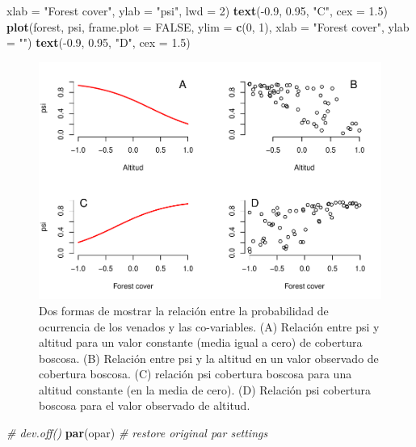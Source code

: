 \documentclass[]{book}
\newenvironment{Shaded}{\begin{snugshade}}{\end{snugshade}}
\newcommand{\KeywordTok}[1]{\textcolor[rgb]{0.13,0.29,0.53}{\textbf{{#1}}}}
\newcommand{\DataTypeTok}[1]{\textcolor[rgb]{0.13,0.29,0.53}{{#1}}}
\newcommand{\DecValTok}[1]{\textcolor[rgb]{0.00,0.00,0.81}{{#1}}}
\newcommand{\FloatTok}[1]{\textcolor[rgb]{0.00,0.00,0.81}{{#1}}}
\newcommand{\StringTok}[1]{\textcolor[rgb]{0.31,0.60,0.02}{{#1}}}
\newcommand{\CommentTok}[1]{\textcolor[rgb]{0.56,0.35,0.01}{\textit{{#1}}}}
\newcommand{\OtherTok}[1]{\textcolor[rgb]{0.56,0.35,0.01}{{#1}}}
\newcommand{\NormalTok}[1]{{#1}}
\begin{document}
\begin{Shaded}
\begin{Highlighting}[]
      \DataTypeTok{xlab =} \StringTok{"Forest cover"}\NormalTok{, }\DataTypeTok{ylab =} \StringTok{"psi"}\NormalTok{, }\DataTypeTok{lwd =} \DecValTok{2}\NormalTok{)}
\KeywordTok{text}\NormalTok{(-}\FloatTok{0.9}\NormalTok{, }\FloatTok{0.95}\NormalTok{, }\StringTok{"C"}\NormalTok{, }\DataTypeTok{cex =} \FloatTok{1.5}\NormalTok{)}
\KeywordTok{plot}\NormalTok{(forest, psi, }\DataTypeTok{frame.plot =} \OtherTok{FALSE}\NormalTok{, }\DataTypeTok{ylim =} \KeywordTok{c}\NormalTok{(}\DecValTok{0}\NormalTok{, }\DecValTok{1}\NormalTok{), }\DataTypeTok{xlab =} \StringTok{"Forest cover"}\NormalTok{, }\DataTypeTok{ylab =} \StringTok{""}\NormalTok{)}
\KeywordTok{text}\NormalTok{(-}\FloatTok{0.9}\NormalTok{, }\FloatTok{0.95}\NormalTok{, }\StringTok{"D"}\NormalTok{, }\DataTypeTok{cex =} \FloatTok{1.5}\NormalTok{)}
\end{Highlighting}
\end{Shaded}

\begin{figure}[htbp]
\centering
\includegraphics{Simul-Machalilla-book_files/figure-latex/graph2-1.pdf}
\caption{\label{fig:graph2}Dos formas de mostrar la relación entre la
probabilidad de ocurrencia de los venados y las co-variables. (A)
Relación entre psi y altitud para un valor constante (media igual a
cero) de cobertura boscosa. (B) Relación entre psi y la altitud en un
valor observado de cobertura boscosa. (C) relación psi cobertura boscosa
para una altitud constante (en la media de cero). (D) Relación psi
cobertura boscosa para el valor observado de altitud.}
\end{figure}

\begin{Shaded}
\begin{Highlighting}[]
\CommentTok{# dev.off()}
\KeywordTok{par}\NormalTok{(opar)          }\CommentTok{# restore original par settings}
\end{Highlighting}
\end{Shaded}
\end{document}

